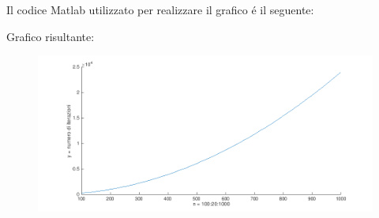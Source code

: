 \begin{center}
\large\noindent{}\end{center}

\noindent Il codice Matlab utilizzato per realizzare il grafico \'e il seguente:



\vspace*{0.5cm}



\vspace*{0.5cm}



\noindent Grafico risultante: 

\begin{figure}[H]
	\includegraphics[width=\textwidth]{Codici/Cap6/es4cap6}
\end{figure}
